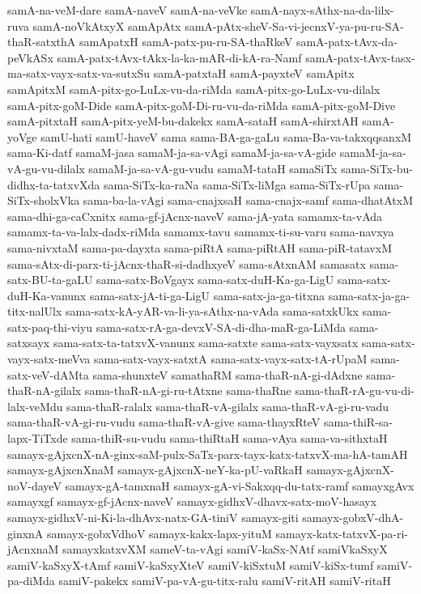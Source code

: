 {samA-na-veM-dare
samA-naveV
samA-na-veVke
samA-nayx-sAthx-na-da-lilx-ruva
samA-noVkAtxyX
samApAtx
samA-pAtx-sheV-Sa-vi-jecnxV-ya-pu-ru-SA-thaR-satxthA
samApatxH
samA-patx-pu-ru-SA-thaRkeV
samA-patx-tAvx-da-peVkASx
samA-patx-tAvx-tAkx-la-ka-mAR-di-kA-ra-Namf
samA-patx-tAvx-tasx-ma-satx-vayx-satx-va-sutxSu
samA-patxtaH
samA-payxteV
samApitx
samApitxM
samA-pitx-go-LuLx-vu-da-riMda
samA-pitx-go-LuLx-vu-dilalx
samA-pitx-goM-Dide
samA-pitx-goM-Di-ru-vu-da-riMda
samA-pitx-goM-Dive
samA-pitxtaH
samA-pitx-yeM-bu-dakekx
samA-sataH
samA-shirxtAH
samA-yoVge
samU-hati
samU-haveV
sama
sama-BA-ga-gaLu
sama-Ba-va-takxqqsanxM
sama-Ki-datf
samaM-jasa
samaM-ja-sa-vAgi
samaM-ja-sa-vA-gide
samaM-ja-sa-vA-gu-vu-dilalx
samaM-ja-sa-vA-gu-vudu
samaM-tataH
samaSiTx
sama-SiTx-bu-didhx-ta-tatxvXda
sama-SiTx-ka-raNa
sama-SiTx-liMga
sama-SiTx-rUpa
sama-SiTx-sholxVka
sama-ba-la-vAgi
sama-cnajxsaH
sama-cnajx-samf
sama-dhatAtxM
sama-dhi-ga-caCxnitx
sama-gf-jAcnx-naveV
sama-jA-yata
samamx-ta-vAda
samamx-ta-va-lalx-dadx-riMda
samamx-tavu
samamx-ti-su-varu
sama-navxya
sama-nivxtaM
sama-pa-dayxta
sama-piRtA
sama-piRtAH
sama-piR-tatavxM
sama-sAtx-di-parx-ti-jAcnx-thaR-si-dadhxyeV
sama-sAtxnAM
samasatx
sama-satx-BU-ta-gaLU
sama-satx-BoVgayx
sama-satx-duH-Ka-ga-LigU
sama-satx-duH-Ka-vanunx
sama-satx-jA-ti-ga-LigU
sama-satx-ja-ga-titxna
sama-satx-ja-ga-titx-nalUlx
sama-satx-kA-yAR-va-li-ya-sAthx-na-vAda
sama-satxkUkx
sama-satx-paq-thi-viyu
sama-satx-rA-ga-devxV-SA-di-dha-maR-ga-LiMda
sama-satxsayx
sama-satx-ta-tatxvX-vanunx
sama-satxte
sama-satx-vayxsatx
sama-satx-vayx-satx-meVva
sama-satx-vayx-satxtA
sama-satx-vayx-satx-tA-rUpaM
sama-satx-veV-dAMta
sama-shunxteV
samathaRM
sama-thaR-nA-gi-dAdxne
sama-thaR-nA-gilalx
sama-thaR-nA-gi-ru-tAtxne
sama-thaRne
sama-thaR-rA-gu-vu-di-lalx-veMdu
sama-thaR-ralalx
sama-thaR-vA-gilalx
sama-thaR-vA-gi-ru-vadu
sama-thaR-vA-gi-ru-vudu
sama-thaR-vA-give
sama-thayxRteV
sama-thiR-sa-lapx-TiTxde
sama-thiR-su-vudu
sama-thiRtaH
sama-vAya
sama-va-sithxtaH
samayx-gAjxcnX-nA-ginx-saM-pulx-SaTx-parx-tayx-katx-tatxvX-ma-hA-tamAH
samayx-gAjxcnXnaM
samayx-gAjxcnX-neY-ka-pU-vaRkaH
samayx-gAjxcnX-noV-dayeV
samayx-gA-tamxnaH
samayx-gA-vi-Sakxqq-du-tatx-ramf
samayxgAvx
samayxgf
samayx-gf-jAcnx-naveV
samayx-gidhxV-dhavx-satx-moV-hasayx
samayx-gidhxV-ni-Ki-la-dhAvx-natx-GA-tiniV
samayx-giti
samayx-gobxV-dhA-ginxnA
samayx-gobxVdhoV
samayx-kakx-lapx-yituM
samayx-katx-tatxvX-pa-ri-jAcnxnaM
samayxkatxvXM
sameV-ta-vAgi
samiV-kaSx-NAtf
samiVkaSxyX
samiV-kaSxyX-tAmf
samiV-kaSxyXteV
samiV-kiSxtuM
samiV-kiSx-tumf
samiV-pa-diMda
samiV-pakekx
samiV-pa-vA-gu-titx-ralu
samiV-ritAH
samiV-ritaH
}
